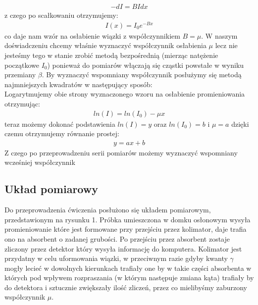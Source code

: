 \documentclass[a4paper]{article}
\begin{document}
\begin{align*}
−dI = B I dx
\end{align*}
z czego po scałkowaniu otrzymujemy:
\begin{align*}
I ( x)=I_0 e^{−B x}
\end{align*}
co daje nam wzór na osłabienie wiązki z współczynnikiem $B = \mu$.
W naszym doświadczeniu chcemy właśnie wyznaczyć współczynnik osłabienia $\mu$ lecz nie jesteśmy tego w stanie zrobić metodą bezpośrednią (mierząc natężenie początkowe $I_0$) ponieważ do pomiarów włączają się cząstki powstałe w wyniku przemiany $\beta$. By wyznaczyć wspomniany współczynnik posłużymy się metodą najmniejszych kwadratów w następujący sposób:\\
Logarytmujemy obie strony wyznaczonego wzoru na osłabienie promieniowania otrzymując:
\begin{align*}
ln( I )=ln( I_0 )−\mu x
\end{align*}
teraz możemy dokonać podstawienia $ln(I) = y$ oraz $ln (I_0 ) =b$ i $\mu = a$ dzięki czemu otrzymujemy równanie prostej:
\begin{align*}
y = ax + b
\end{align*}
Z czego po przeprowadzeniu serii pomiarów możemy wyznaczyć wspomniany wcześniej współczynnik



\subsection{Układ pomiarowy} %
Do przeprowadzenia ćwiczenia posłużono się układem pomiarowym,
przedstawionym na rysunku 1. Próbka umieszczona w domku osłonowym wysyła promieniowanie które jest formowane przy przejściu przez kolimator, daje trafia ono na absorbent o zadanej grubości. Po przejściu przez absorbent zostaje zliczony przez detektor który wysyła informację do komputera. Kolimator jest przydatny w celu uformowania wiązki, w przeciwnym razie gdyby kwanty $\gamma$ mogły lecieć w dowolnych kierunkach trafiały one by w takie części absorbenta w których pod wpływem rozpraszania (w którym następuje zmiana kąta) trafiały by do detektora i sztucznie zwiększały ilość zliczeń, przez co mielibyśmy zaburzony współczynnik $\mu$.
\end{document}
